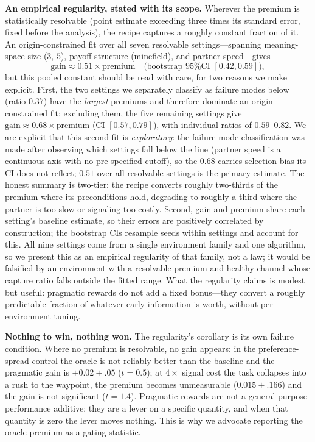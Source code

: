\documentclass{article}
\begin{document}
\textbf{An empirical regularity, stated with its scope.} Wherever the premium is statistically resolvable (point estimate exceeding three times its standard error, fixed before the analysis), the recipe captures a roughly constant fraction of it. An origin-constrained fit over all seven resolvable settings---spanning meaning-space size ($3$, $5$), payoff structure (minefield), and partner speed---gives
\begin{equation}
\text{gain} \approx 0.51 \times \text{premium} \quad \text{(bootstrap 95\% CI } [0.42, 0.59]\text{)},
\end{equation}
but this pooled constant should be read with care, for two reasons we make explicit. First, the two settings we separately classify as failure modes below (ratio $0.37$) have the \emph{largest} premiums and therefore dominate an origin-constrained fit; excluding them, the five remaining settings give $\text{gain} \approx 0.68 \times \text{premium}$ (CI $[0.57, 0.79]$), with individual ratios of $0.59$--$0.82$. We are explicit that this second fit is \emph{exploratory}: the failure-mode classification was made after observing which settings fall below the line (partner speed is a continuous axis with no pre-specified cutoff), so the $0.68$ carries selection bias its CI does not reflect; $0.51$ over all resolvable settings is the primary estimate. The honest summary is two-tier: the recipe converts roughly two-thirds of the premium where its preconditions hold, degrading to roughly a third where the partner is too slow or signaling too costly. Second, gain and premium share each setting's baseline estimate, so their errors are positively correlated by construction; the bootstrap CIs resample seeds within settings and account for this. All nine settings come from a single environment family and one algorithm, so we present this as an empirical regularity of that family, not a law; it would be falsified by an environment with a resolvable premium and healthy channel whose capture ratio falls outside the fitted range. What the regularity claims is modest but useful: pragmatic rewards do not add a fixed bonus---they convert a roughly predictable fraction of whatever early information is worth, without per-environment tuning.

\textbf{Nothing to win, nothing won.} The regularity's corollary is its own failure condition. Where no premium is resolvable, no gain appears: in the preference-spread control the oracle is not reliably better than the baseline and the pragmatic gain is $+0.02\pm.05$ ($t=0.5$); at $4\times$ signal cost the task collapses into a rush to the waypoint, the premium becomes unmeasurable ($0.015\pm.166$) and the gain is not significant ($t=1.4$). Pragmatic rewards are not a general-purpose performance additive; they are a lever on a specific quantity, and when that quantity is zero the lever moves nothing. This is why we advocate reporting the oracle premium as a gating statistic.
\end{document}
